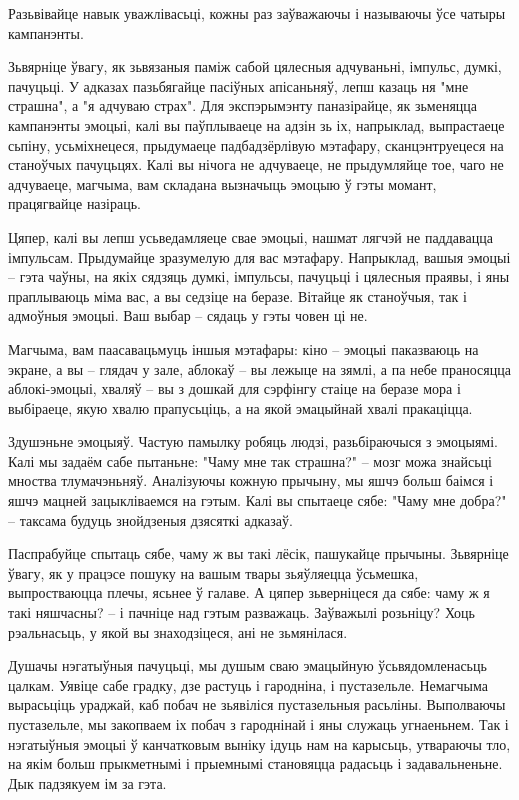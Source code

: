 Разьвівайце навык уважлівасьці, кожны раз заўважаючы і называючы ўсе чатыры кампанэнты.

Зьвярніце ўвагу, як зьвязаныя паміж сабой цялесныя адчуваньні, імпульс, думкі, пачуцьці. У адказах пазьбягайце пасіўных апісаньняў, лепш казаць ня "мне страшна", а "я адчуваю страх". Для экспэрымэнту паназірайце, як зьменяцца кампанэнты эмоцыі, калі вы паўплываеце на адзін зь іх, напрыклад, выпрастаеце сьпіну, усьміхнецеся, прыдумаеце падбадзёрлівую мэтафару, сканцэнтруецеся на станоўчых пачуцьцях. Калі вы нічога не адчуваеце, не прыдумляйце тое, чаго не адчуваеце, магчыма, вам складана вызначыць эмоцыю ў гэты момант, працягвайце назіраць.

Цяпер, калі вы лепш усьведамляеце свае эмоцыі, нашмат лягчэй не паддавацца імпульсам. Прыдумайце зразумелую для вас мэтафару. Напрыклад, вашыя эмоцыі – гэта чаўны, на якіх сядзяць думкі, імпульсы, пачуцьці і цялесныя праявы, і яны праплываюць міма вас, а вы седзіце на беразе. Вітайце як станоўчыя, так і адмоўныя эмоцыі. Ваш выбар – сядаць у гэты човен ці не.

Магчыма, вам паасавацьмуць іншыя мэтафары: кіно – эмоцыі паказваюць на экране, а вы – глядач у зале, аблокаў – вы лежыце на зямлі, а па небе праносяцца аблокі-эмоцыі, хваляў – вы з дошкай для сэрфінгу стаіце на беразе мора і выбіраеце, якую хвалю прапусьціць, а на якой эмацыйнай хвалі пракаціцца.

Здушэньне эмоцыяў. Частую памылку робяць людзі, разьбіраючыся з эмоцыямі. Калі мы задаём сабе пытаньне: "Чаму мне так страшна?" -- мозг можа знайсьці мноства тлумачэньняў. Аналізуючы кожную прычыну, мы яшчэ больш баімся і яшчэ мацней зацыкліваемся на гэтым. Калі вы спытаеце сябе: "Чаму мне добра?" -- таксама будуць знойдзеныя дзясяткі адказаў.

Паспрабуйце спытаць сябе, чаму ж вы такі лёсік, пашукайце прычыны. Зьвярніце ўвагу, як у працэсе пошуку на вашым твары зьяўляецца ўсьмешка, выпростваюцца плечы, ясьнее ў галаве. А цяпер зьверніцеся да сябе: чаму ж я такі няшчасны? – і пачніце над гэтым разважаць. Заўважылі розьніцу? Хоць рэальнасьць, у якой вы знаходзіцеся, ані не зьмянілася.

Душачы нэгатыўныя пачуцьці, мы душым сваю эмацыйную ўсьвядомленасьць цалкам. Уявіце сабе градку, дзе растуць і гародніна, і пустазельле. Немагчыма вырасьціць ураджай, каб побач не зьявіліся пустазельныя расьліны. Выполваючы пустазельле, мы закопваем іх побач з гароднінай і яны служаць угнаеньнем. Так і нэгатыўныя эмоцыі ў канчатковым выніку ідуць нам на карысьць, утвараючы тло, на якім больш прыкметнымі і прыемнымі становяцца радасьць і задавальненьне. Дык падзякуем ім за гэта.

